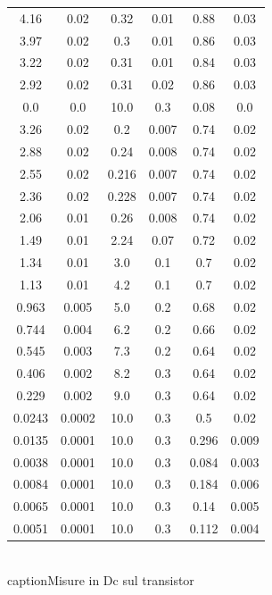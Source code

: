 \documentclass[10pt,a4paper]{article}
\begin{document}
\begin{table}[!htb]\centering
\begin{tabular}{|c|c|c|c|c|c|}
\hline
4.16 & 0.02 & 0.32 & 0.01 & 0.88 & 0.03\\
3.97 & 0.02 & 0.3 & 0.01 & 0.86 & 0.03\\
3.22 & 0.02 & 0.31 & 0.01 & 0.84 & 0.03\\
2.92 & 0.02 & 0.31 & 0.02 & 0.86 & 0.03\\
0.0 & 0.0 & 10.0 & 0.3 & 0.08 & 0.0\\
3.26 & 0.02 & 0.2 & 0.007 & 0.74 & 0.02\\
2.88 & 0.02 & 0.24 & 0.008 & 0.74 & 0.02\\
2.55 & 0.02 & 0.216 & 0.007 & 0.74 & 0.02\\
2.36 & 0.02 & 0.228 & 0.007 & 0.74 & 0.02\\
2.06 & 0.01 & 0.26 & 0.008 & 0.74 & 0.02\\
1.49 & 0.01 & 2.24 & 0.07 & 0.72 & 0.02\\
1.34 & 0.01 & 3.0 & 0.1 & 0.7 & 0.02\\
1.13 & 0.01 & 4.2 & 0.1 & 0.7 & 0.02\\
0.963 & 0.005 & 5.0 & 0.2 & 0.68 & 0.02\\
0.744 & 0.004 & 6.2 & 0.2 & 0.66 & 0.02\\
0.545 & 0.003 & 7.3 & 0.2 & 0.64 & 0.02\\
0.406 & 0.002 & 8.2 & 0.3 & 0.64 & 0.02\\
0.229 & 0.002 & 9.0 & 0.3 & 0.64 & 0.02\\
0.0243 & 0.0002 & 10.0 & 0.3 & 0.5 & 0.02\\
0.0135 & 0.0001 & 10.0 & 0.3 & 0.296 & 0.009\\
0.0038 & 0.0001 & 10.0 & 0.3 & 0.084 & 0.003\\
0.0084 & 0.0001 & 10.0 & 0.3 & 0.184 & 0.006\\
0.0065 & 0.0001 & 10.0 & 0.3 & 0.14 & 0.005\\
0.0051 & 0.0001 & 10.0 & 0.3 & 0.112 & 0.004\\
\hline
\end{tabular}\\caption{Misure in Dc sul transistor} \label{misureDC}
\end{table} 
\end{document}
